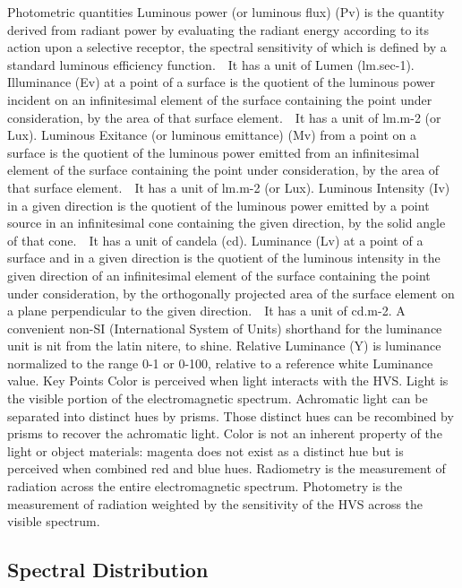 Photometric quantities
Luminous power (or luminous flux) (Pv) is the quantity derived from radiant power by evaluating the radiant energy according to its action upon a selective receptor, the spectral sensitivity of which is defined by a standard luminous efficiency function.   It has a unit of Lumen (lm.sec-1).
Illuminance (Ev) at a point of a surface is the quotient of the luminous power incident on an infinitesimal element of the surface containing the point under consideration, by the area of that surface element.   It has a unit of lm.m-2 (or Lux).
Luminous Exitance (or luminous emittance) (Mv) from a point on a surface is the quotient of the luminous power emitted from an infinitesimal element of the surface containing the point under consideration, by the area of that surface element.   It has a unit of lm.m-2 (or Lux).
Luminous Intensity (Iv) in a given direction is the quotient of the luminous power emitted by a point source in an infinitesimal cone containing the given direction, by the solid angle of that cone.   It has a unit of candela (cd).
Luminance (Lv) at a point of a surface and in a given direction is the quotient of the luminous intensity in the given direction of an infinitesimal element of the surface containing the point under consideration, by the orthogonally projected area of the surface element on a plane perpendicular to the given direction.   It has a unit of cd.m-2. A convenient non-SI (International System of Units) shorthand for the luminance unit is nit from the latin nitere, to shine.
Relative Luminance (Y) is luminance normalized to the range 0-1 or 0-100, relative to a reference white Luminance value.
Key Points
Color is perceived when light interacts with the HVS.
Light is the visible portion of the electromagnetic spectrum.
Achromatic light can be separated into distinct hues by prisms. Those distinct hues can be recombined by prisms to recover the achromatic light.
Color is not an inherent property of the light or object materials:  magenta does not exist as a distinct hue but is perceived when combined red and blue hues.
Radiometry is the measurement of radiation across the entire electromagnetic spectrum.
Photometry is the measurement of radiation weighted by the sensitivity of the HVS across the visible spectrum.

\subsection{Spectral Distribution}%
\label{subsec:spectral-distribution}

